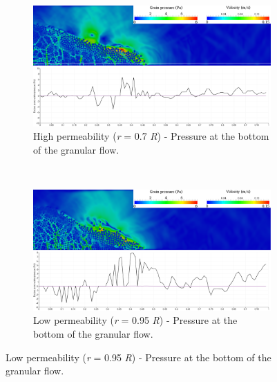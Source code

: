 \documentclass[12pt,a4paper,twocolumn,fleqn]{narms}
\begin{document}
\begin{figure}
\centering
\begin{subfigure}[t]{0.975\linewidth}
	\centering
    \includegraphics[width=\linewidth]{figs/a08/r07_PWP_flow_dense}
    \caption{High permeability (\textit{r} = 0.7 \textit{R}) - Pressure at the 
    bottom of the granular flow.}
    \label{fig:r07_PWP_flow_dense}
\end{subfigure}
\\
\begin{subfigure}[t]{0.975\linewidth}
	\centering
    \includegraphics[width=\linewidth]{figs/a08/r095_PWP_flow_dense}
    \caption{Low permeability (\textit{r} = 0.95 \textit{R}) - Pressure at the 
        bottom of the granular flow.}
    \label{fig:r095_PWP_flow_dense}
\end{subfigure}
\end{figure}
\end{document}
